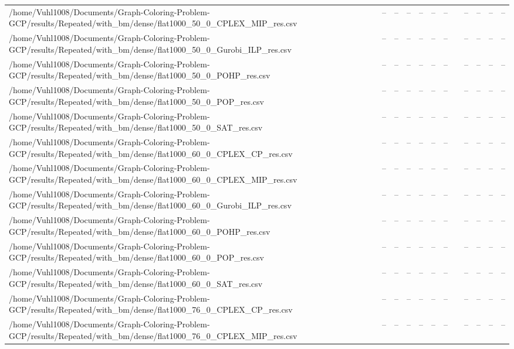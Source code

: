 \begin{table}[htbp]
\begin{tabular}{llllllllllll}
/home/Vuhl1008/Documents/Graph-Coloring-Problem-GCP/results/Repeated/with\_bm/dense/flat1000\_50\_0\_CPLEX\_MIP\_res.csv & -- & -- & -- & -- & -- & -- & {} & -- & -- & -- & -- \\
/home/Vuhl1008/Documents/Graph-Coloring-Problem-GCP/results/Repeated/with\_bm/dense/flat1000\_50\_0\_Gurobi\_ILP\_res.csv & -- & -- & -- & -- & -- & -- & {} & -- & -- & -- & -- \\
/home/Vuhl1008/Documents/Graph-Coloring-Problem-GCP/results/Repeated/with\_bm/dense/flat1000\_50\_0\_POHP\_res.csv & -- & -- & -- & -- & -- & -- & {} & -- & -- & -- & -- \\
/home/Vuhl1008/Documents/Graph-Coloring-Problem-GCP/results/Repeated/with\_bm/dense/flat1000\_50\_0\_POP\_res.csv & -- & -- & -- & -- & -- & -- & {} & -- & -- & -- & -- \\
/home/Vuhl1008/Documents/Graph-Coloring-Problem-GCP/results/Repeated/with\_bm/dense/flat1000\_50\_0\_SAT\_res.csv & -- & -- & -- & -- & -- & -- & {} & -- & -- & -- & -- \\
/home/Vuhl1008/Documents/Graph-Coloring-Problem-GCP/results/Repeated/with\_bm/dense/flat1000\_60\_0\_CPLEX\_CP\_res.csv & -- & -- & -- & -- & -- & -- & {} & -- & -- & -- & -- \\
/home/Vuhl1008/Documents/Graph-Coloring-Problem-GCP/results/Repeated/with\_bm/dense/flat1000\_60\_0\_CPLEX\_MIP\_res.csv & -- & -- & -- & -- & -- & -- & {} & -- & -- & -- & -- \\
/home/Vuhl1008/Documents/Graph-Coloring-Problem-GCP/results/Repeated/with\_bm/dense/flat1000\_60\_0\_Gurobi\_ILP\_res.csv & -- & -- & -- & -- & -- & -- & {} & -- & -- & -- & -- \\
/home/Vuhl1008/Documents/Graph-Coloring-Problem-GCP/results/Repeated/with\_bm/dense/flat1000\_60\_0\_POHP\_res.csv & -- & -- & -- & -- & -- & -- & {} & -- & -- & -- & -- \\
/home/Vuhl1008/Documents/Graph-Coloring-Problem-GCP/results/Repeated/with\_bm/dense/flat1000\_60\_0\_POP\_res.csv & -- & -- & -- & -- & -- & -- & {} & -- & -- & -- & -- \\
/home/Vuhl1008/Documents/Graph-Coloring-Problem-GCP/results/Repeated/with\_bm/dense/flat1000\_60\_0\_SAT\_res.csv & -- & -- & -- & -- & -- & -- & {} & -- & -- & -- & -- \\
/home/Vuhl1008/Documents/Graph-Coloring-Problem-GCP/results/Repeated/with\_bm/dense/flat1000\_76\_0\_CPLEX\_CP\_res.csv & -- & -- & -- & -- & -- & -- & {} & -- & -- & -- & -- \\
/home/Vuhl1008/Documents/Graph-Coloring-Problem-GCP/results/Repeated/with\_bm/dense/flat1000\_76\_0\_CPLEX\_MIP\_res.csv & -- & -- & -- & -- & -- & -- & {} & -- & -- & -- & -- \\

\end{tabular}
\end{table}
